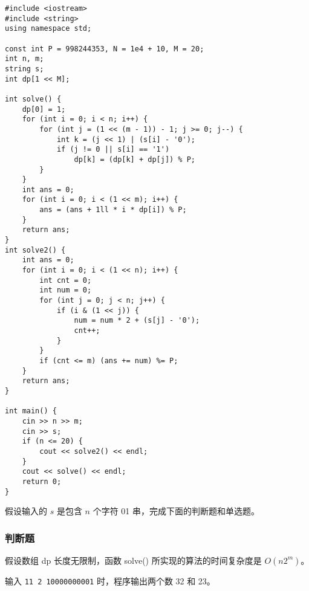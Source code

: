 \documentclass{exam-zh}
\newcommand{\code}[1]{\texttt{#1}}
\newcommand{\true}{\paren[$\checkmark$]}
\begin{document}
\begin{lstlisting}
#include <iostream>
#include <string>
using namespace std;

const int P = 998244353, N = 1e4 + 10, M = 20;
int n, m;
string s;
int dp[1 << M];

int solve() {
    dp[0] = 1;
    for (int i = 0; i < n; i++) {
        for (int j = (1 << (m - 1)) - 1; j >= 0; j--) {
            int k = (j << 1) | (s[i] - '0');
            if (j != 0 || s[i] == '1')
                dp[k] = (dp[k] + dp[j]) % P;
        }
    }
    int ans = 0;
    for (int i = 0; i < (1 << m); i++) {
        ans = (ans + 1ll * i * dp[i]) % P;
    }
    return ans;
}
int solve2() {
    int ans = 0;
    for (int i = 0; i < (1 << n); i++) {
        int cnt = 0;
        int num = 0;
        for (int j = 0; j < n; j++) {
            if (i & (1 << j)) {
                num = num * 2 + (s[j] - '0');
                cnt++;
            }
        }
        if (cnt <= m) (ans += num) %= P;
    }
    return ans;
}

int main() {
    cin >> n >> m;
    cin >> s;
    if (n <= 20) {
        cout << solve2() << endl;
    }
    cout << solve() << endl;
    return 0;
}
\end{lstlisting}
假设输入的 $s$ 是包含 $n$ 个字符 01 串，完成下面的判断题和单选题。

\begin{solution}

\end{solution}

\subsubsection{判断题}

\begin{question}
    假设数组 dp 长度无限制，函数 solve() 所实现的算法的时间复杂度是 $O(n2^m)$。\true
    \begin{solution}

    \end{solution}
\end{question}

\begin{question}
    输入 \code{11 2 10000000001} 时，程序输出两个数 32 和 23。\true
    \begin{solution}

    \end{solution}
\end{question}
\end{document}
